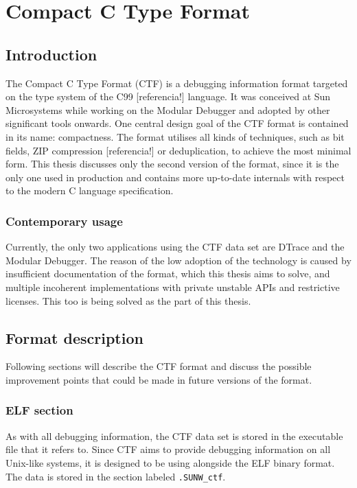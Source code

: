 \chapter{Compact C Type Format}

\section{Introduction}
The Compact C Type Format (CTF) is a debugging information format targeted on
the type system of the C99 [referencia!] language. It was conceived at Sun
Microsystems while working on the Modular Debugger and adopted by other
significant tools onwards. One central design goal of the CTF format is
contained in its name: compactness. The format utilises all kinds of
techniques, such as bit fields, ZIP compression [referencia!] or deduplication,
to achieve the most minimal form. This thesis discusses only the second version
of the format, since it is the only one used in production and contains more
up-to-date internals with respect to the modern C language specification.

\subsection{Contemporary usage}
Currently, the only two applications using the CTF data set are DTrace and the
Modular Debugger. The reason of the low adoption of the technology is caused by
insufficient documentation of the format, which this thesis aims to solve, and
multiple incoherent implementations with private unstable APIs and restrictive
licenses. This too is being solved as the part of this thesis.

\section{Format description}
Following sections will describe the CTF format and discuss the possible
improvement points that could be made in future versions of the format.

\subsection{ELF section}
As with all debugging information, the CTF data set is stored in the executable
file that it refers to. Since CTF aims to provide debugging information on all
Unix-like systems, it is designed to be using alongside the ELF binary format.
The data is stored in the section labeled \texttt{.SUNW\_ctf}.

